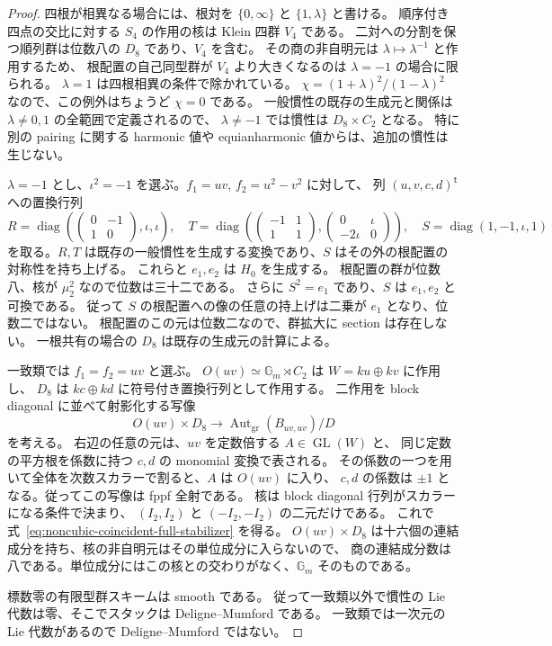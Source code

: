 \begin{proof}
四根が相異なる場合には、根対を $\{0,\infty\}$ と $\{1,\lambda\}$ と書ける。
順序付き四点の交比に対する $S_4$ の作用の核は Klein 四群 $V_4$ である。
二対への分割を保つ順列群は位数八の $D_8$ であり、$V_4$ を含む。
その商の非自明元は $\lambda\mapsto\lambda^{-1}$ と作用するため、
根配置の自己同型群が $V_4$ より大きくなるのは $\lambda=-1$ の場合に限られる。
$\lambda=1$ は四根相異の条件で除かれている。
$\chi=(1+\lambda)^2/(1-\lambda)^2$ なので、この例外はちょうど $\chi=0$ である。
一般慣性の既存の生成元と関係は $\lambda\ne0,1$ の全範囲で定義されるので、
$\lambda\ne-1$ では慣性は $D_8\times C_2$ となる。
特に別の pairing に関する harmonic 値や equianharmonic 値からは、追加の慣性は生じない。

$\lambda=-1$ とし、$\iota^2=-1$ を選ぶ。$f_1=uv$, $f_2=u^2-v^2$ に対して、
列 $(u,v,c,d)^{\mathsf t}$ への置換行列
\[
 R=\operatorname{diag}\!\left(\begin{pmatrix}0&-1\\1&0\end{pmatrix},\iota,\iota\right),
 \quad
 T=\operatorname{diag}\!\left(\begin{pmatrix}-1&1\\1&1\end{pmatrix},
              \begin{pmatrix}0&\iota\\-2\iota&0\end{pmatrix}\right),
 \quad S=\operatorname{diag}(1,-1,\iota,1)
\]
を取る。$R,T$ は既存の一般慣性を生成する変換であり、$S$ はその外の根配置の対称性を持ち上げる。
これらと $e_1,e_2$ は $H_0$ を生成する。
根配置の群が位数八、核が $\mu_2^2$ なので位数は三十二である。
さらに $S^2=e_1$ であり、$S$ は $e_1,e_2$ と可換である。
従って $S$ の根配置への像の任意の持上げは二乗が $e_1$ となり、位数二ではない。
根配置のこの元は位数二なので、群拡大に section は存在しない。
一根共有の場合の $D_8$ は既存の生成元の計算による。

一致類では $f_1=f_2=uv$ と選ぶ。
$O(uv)\simeq\mathbb G_m\rtimes C_2$ は $W=ku\oplus kv$ に作用し、
$D_8$ は $kc\oplus kd$ に符号付き置換行列として作用する。
二作用を block diagonal に並べて射影化する写像
\[
 O(uv)\times D_8\longrightarrow\operatorname{Aut}_{\mathrm{gr}}(B_{uv,uv})/D
\]
を考える。
右辺の任意の元は、$uv$ を定数倍する $A\in\operatorname{GL}(W)$ と、
同じ定数の平方根を係数に持つ $c,d$ の monomial 変換で表される。
その係数の一つを用いて全体を次数スカラーで割ると、$A$ は $O(uv)$ に入り、
$c,d$ の係数は $\pm1$ となる。従ってこの写像は fppf 全射である。
核は block diagonal 行列がスカラーになる条件で決まり、
$(I_2,I_2)$ と $(-I_2,-I_2)$ の二元だけである。
これで式~\eqref{eq:noncubic-coincident-full-stabilizer} を得る。
$O(uv)\times D_8$ は十六個の連結成分を持ち、核の非自明元はその単位成分に入らないので、
商の連結成分数は八である。単位成分にはこの核との交わりがなく、$\mathbb G_m$ そのものである。

標数零の有限型群スキームは smooth である。
従って一致類以外で慣性の Lie 代数は零、そこでスタックは Deligne--Mumford である。
一致類では一次元の Lie 代数があるので Deligne--Mumford ではない。
\end{proof}

